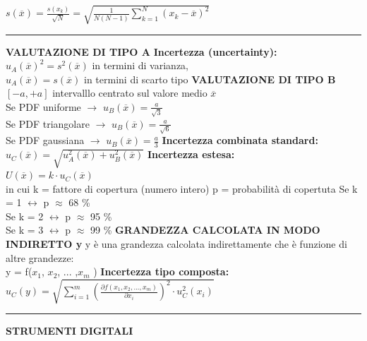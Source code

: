\documentclass{article}
\begin{document}
\begin{multicols*}{3}
    $s(\overline{x}) = \frac{s(x_k)}{\sqrt{N}} = \sqrt{\frac{1}{N (N-1)} \sum_{k=1}^{N} (x_k - \overline{x})^{2}}$ \newline 
    \hrule
    \textbf{VALUTAZIONE DI TIPO A} \newline
    \textbf{Incertezza (uncertainty):}\\
    $u_A(\overline{x}) ^{2} = s^{2} (\overline{x})$ in termini di varianza, \\
    $u_A(\overline{x}) = s (\overline{x})$ in termini di scarto tipo \newline
    \textbf{VALUTAZIONE DI TIPO B} \newline
    $[-a, +a]$ intervalllo centrato sul valore medio $\overline{x}$ \\
    Se PDF uniforme $\to$ $u_B (\overline{x}) = \frac{a}{\sqrt{3}}$ \\ 
    Se PDF triangolare $\to$ $u_B (\overline{x}) = \frac{a}{\sqrt{6}}$ \\ 
    Se PDF gaussiana $\to$ $u_B (\overline{x}) = \frac{a}{3}$ \newline 
    \textbf{Incertezza combinata standard:}\\
    $u_C (\overline{x}) = \sqrt{u_A ^{2} (\overline{x}) + u_B ^{2} (\overline{x})}$ \newline 
    \textbf{Incertezza estesa:} \\
    $U(\overline{x}) = k \cdot u_C (\overline{x})$ \\
    in cui k = fattore di copertura (numero intero) \newline
    p = probabilità di copertuta \newline 
    Se k = 1 $\leftrightarrow$ p $\approx$ 68 \% \\
    Se k = 2 $\leftrightarrow$ p $\approx$ 95 \% \\
    Se k = 3 $\leftrightarrow$ p $\approx$ 99 \% \newline
    \textbf{GRANDEZZA CALCOLATA IN MODO INDIRETTO y}\newline 
    y è una grandezza calcolata indirettamente che è funzione di altre grandezze: \\
    y = f($x_1$, $x_2$, ... ,$x_m$ ) \newline
    \textbf{Incertezza tipo composta:} \\
    $u_C (y) = \sqrt{\sum_{i = 1}^{m} \left( \frac{\partial f(x_1, x_2, ... ,x_m )}{\partial x_i}\right)^{2} \cdot u_C ^{2} (x_i)}$ \newline
    \hrule 
    \textbf{STRUMENTI DIGITALI} \newline 

\end{multicols*}
\end{document}
